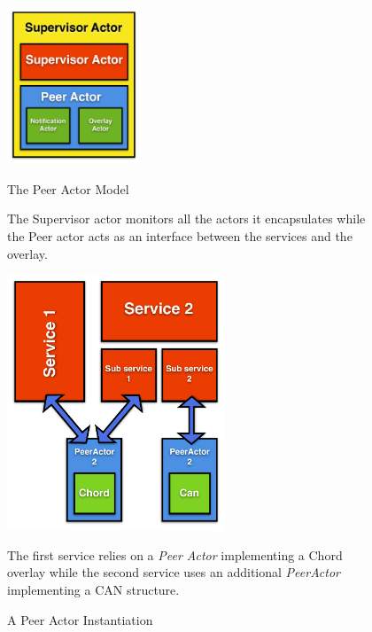 \begin{figure}
  \begin{minipage}[c]{.35\linewidth}
	\vspace*{2.5cm}
   \hspace*{-0.5cm}
      	\centering \includegraphics[width=4cm]{./FIGS/PeerActor.pdf}

   \hspace*{0.5cm}
	\vspace*{.8cm}
		\caption{The Peer Actor Model}
		{\small The Supervisor actor monitors all the actors it encapsulates while the Peer actor acts as an interface between the services and the overlay.}
\label{fig:supervisor}
   \end{minipage}
\hspace*{0.6cm}
   \begin{minipage}[c]{.55\linewidth}
   	\centering \includegraphics[width=6.5cm]{./FIGS/PeerActorServices.pdf}
	\vspace*{-0.25cm}
		\caption{A Peer Actor Instantiation}
		\label{fig:peeractor} 
{\small The first service relies on a \emph{Peer Actor} implementing a Chord
overlay while the second service uses an additional \emph{PeerActor} implementing a CAN structure.}
  \end{minipage} \hfill
\end{figure}

